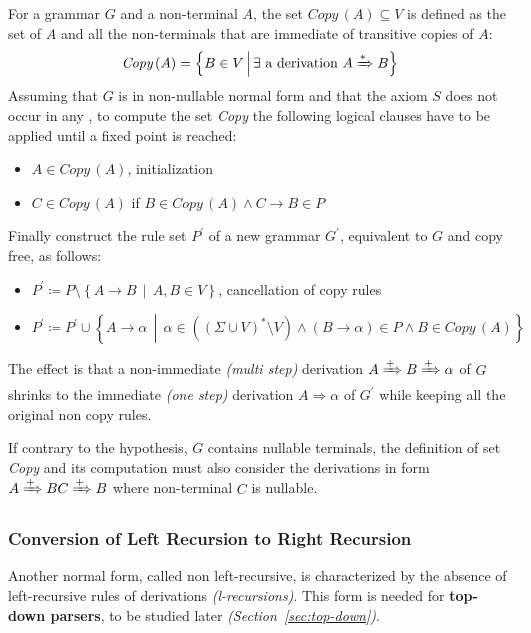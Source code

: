 \documentclass[english]{article}
\begin{document}
For a grammar \(G\) and a non-terminal \(A\), the set \(\textit{Copy}\,(A) \subseteq V\) is defined as the set of \(A\) and all the non-terminals that are immediate of transitive copies of \(A\):
\[ \textit{Copy}\,(A) = \left\{ B \in V \, \middle| \, \exists \text{ a derivation } A \xRightarrow{\ast} B \right\} \]
Assuming that \(G\) is in non-nullable normal form and that the axiom \(S\) does not occur in any \RP,
to compute the set \textit{Copy} the following logical clauses have to be applied until a fixed point is reached:
\begin{itemize}
  \item \(A \in \textit{Copy}\,(A)\), initialization
  \item \(C \in \textit{Copy}\,(A)\) if \(B \in \textit{Copy}\,(A) \land C \rightarrow B \in P\)
\end{itemize}
Finally construct the rule set \(P^\prime\) of a new grammar \(G^\prime\), equivalent to \(G\) and copy free, as follows:
\begin{itemize}
  \item \(P^\prime \coloneqq P \setminus \left\{ A \rightarrow B \, \middle| \, A, B \in V \right\}\), cancellation of copy rules
  \item \(P^\prime \coloneqq P^\prime \cup \left\{ A \rightarrow \alpha \, \middle| \, \alpha \in \left( \left( \Sigma \cup V \right)^\ast \setminus V \right) \land \left( B \rightarrow \alpha \right) \in P \land B \in \textit{Copy}\,(A) \right\}\)
\end{itemize}

The effect is that a non-immediate \textit{(multi step)} derivation \(A \xRightarrow{+} B \xRightarrow{+} \alpha\) of \(G\) shrinks to the immediate \textit{(one step)} derivation \(A \Rightarrow \alpha\) of \(G^\prime\) while keeping all the original non copy rules.

\bigskip
If contrary to the hypothesis, \(G\) contains nullable terminals, the definition of set \textit{Copy} and its computation must also consider the derivations in form \(A \xRightarrow{+} BC \xRightarrow{+} B\) where non-terminal \(C\) is nullable.

\subsubsection{Conversion of Left Recursion to Right Recursion}
\label{sec:conversion-of-left-recursion-to-right-recursion}

Another normal form, called non left-recursive, is characterized by the absence of left-recursive rules of derivations \textit{(l-recursions)}.
This form is needed for \textbf{top-down parsers}, to be studied later \textit{(Section~\ref{sec:top-down})}.
\end{document}
